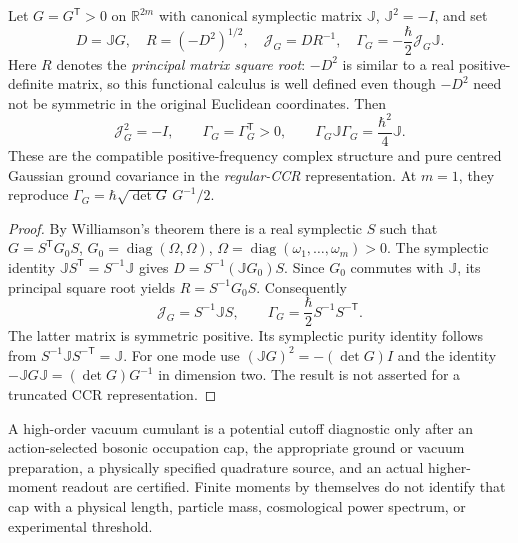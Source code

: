 \documentclass[12pt,a4paper]{article}
\begin{document}
\begin{theorem}
\label{p4c:thm:v347-multimode-covariance}
Let \(G=G^{\mathsf T}>0\) on \(\mathbb R^{2m}\) with canonical
symplectic matrix \(\mathbb J\), \(\mathbb J^2=-I\), and set
\[
 D=\mathbb JG,\quad
 R=(-D^2)^{1/2},\quad
 \mathcal J_G=DR^{-1},\quad
 \Gamma_G=-\frac\hbar2\mathcal J_G\mathbb J.
\]
Here \(R\) denotes the \emph{principal matrix square root}:
\(-D^2\) is similar to a real positive-definite matrix, so this
functional calculus is well defined even though \(-D^2\) need not
be symmetric in the original Euclidean coordinates.  Then
\begin{equation}\label{p4c:eq:v347-multimode-covariance}
 \boxed{\mathcal J_G^2=-I,\qquad
 \Gamma_G=\Gamma_G^{\mathsf T}>0,\qquad
 \Gamma_G\mathbb J\Gamma_G=\frac{\hbar^2}{4}\mathbb J.}
\end{equation}
These are the compatible positive-frequency complex structure and
pure centred Gaussian ground covariance in the \emph{regular-CCR}
representation.  At \(m=1\), they reproduce
\(\Gamma_G=\hbar\sqrt{\det G}\,G^{-1}/2\).
\end{theorem}
\begin{proof}
By Williamson's theorem there is a real symplectic \(S\) such that
\(G=S^{\mathsf T}G_0S\),
\(G_0=\operatorname{diag}(\Omega,\Omega)\),
\(\Omega=\operatorname{diag}(\omega_1,\ldots,\omega_m)>0\).
The symplectic identity \(\mathbb JS^{\mathsf T}=S^{-1}\mathbb J\)
gives \(D=S^{-1}(\mathbb JG_0)S\).  Since \(G_0\) commutes with
\(\mathbb J\), its principal square root yields
\(R=S^{-1}G_0S\).  Consequently
\[
 \mathcal J_G=S^{-1}\mathbb JS,\qquad
 \Gamma_G=\frac\hbar2S^{-1}S^{-\mathsf T}.
\]
The latter matrix is symmetric positive.  Its symplectic purity
identity follows from \(S^{-1}\mathbb JS^{-\mathsf T}=\mathbb J\).
For one mode use \((\mathbb JG)^2=-(\det G)I\) and the identity
\(-\mathbb JG\mathbb J=(\det G)G^{-1}\) in dimension two.
The result is not asserted for a truncated CCR representation.
\end{proof}

\begin{remark}
\label{p4c:rem:v347-cumulant-license}
A high-order vacuum cumulant is a potential cutoff diagnostic only after
an action-selected bosonic occupation cap, the appropriate ground or
vacuum preparation, a physically specified quadrature source, and an
actual higher-moment readout are certified.  Finite moments by
themselves do not identify that cap with a physical length, particle
mass, cosmological power spectrum, or experimental threshold.
\end{remark}
\end{document}
